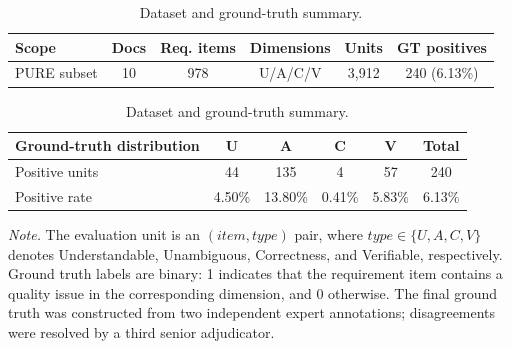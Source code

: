 \begin{table}[t]
\centering
\caption{Dataset and ground-truth summary.}
\label{tab:dataset_gt_summary}
\small
\begin{tabular}{lccccc}
\toprule
\textbf{Scope} & \textbf{Docs} & \textbf{Req. items} & \textbf{Dimensions} & \textbf{Units} & \textbf{GT positives} \\
\midrule
PURE subset & 10 & 978 & U/A/C/V & 3,912 & 240 (6.13\%) \\
\bottomrule
\end{tabular}

\vspace{0.6em}

\begin{tabular}{lccccc}
\toprule
\textbf{Ground-truth distribution} & \textbf{U} & \textbf{A} & \textbf{C} & \textbf{V} & \textbf{Total} \\
\midrule
Positive units & 44 & 135 & 4 & 57 & 240 \\
Positive rate & 4.50\% & 13.80\% & 0.41\% & 5.83\% & 6.13\% \\
\bottomrule
\end{tabular}

\vspace{0.4em}
\begin{minipage}{0.95\linewidth}
\footnotesize
\textit{Note.} The evaluation unit is an $(item,type)$ pair, where $type \in \{U,A,C,V\}$ denotes Understandable, Unambiguous, Correctness, and Verifiable, respectively. Ground truth labels are binary: 1 indicates that the requirement item contains a quality issue in the corresponding dimension, and 0 otherwise. The final ground truth was constructed from two independent expert annotations; disagreements were resolved by a third senior adjudicator.
\end{minipage}
\end{table}
